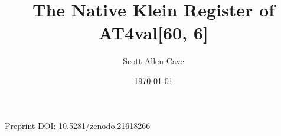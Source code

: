 \documentclass[11pt]{article}
\title{The Native Klein Register of AT4val[60, 6]}
\author{Scott Allen Cave}
\date{\today}
\begin{document}
\maketitle

\begin{center}
Preprint DOI:
\href{https://doi.org/10.5281/zenodo.21618266}{10.5281/zenodo.21618266}
\end{center}



\tableofcontents



















\appendix






\end{document}

